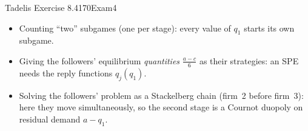 \begin{exsol}{Tadelis Exercise 8.4}{170}{Exam}{4}
\mistakes
\begin{itemize}
  \item Counting ``two'' subgames (one per stage): every value of $q_1$ starts its own subgame.
  \item Giving the followers' equilibrium \emph{quantities} $\frac{a-c}{6}$ as their strategies: an SPE
  needs the reply functions $q_j(q_1)$.
  \item Solving the followers' problem as a Stackelberg chain (firm~2 before firm~3): here they move
  simultaneously, so the second stage is a Cournot duopoly on residual demand $a - q_1$.
\end{itemize}

\end{exsol}
